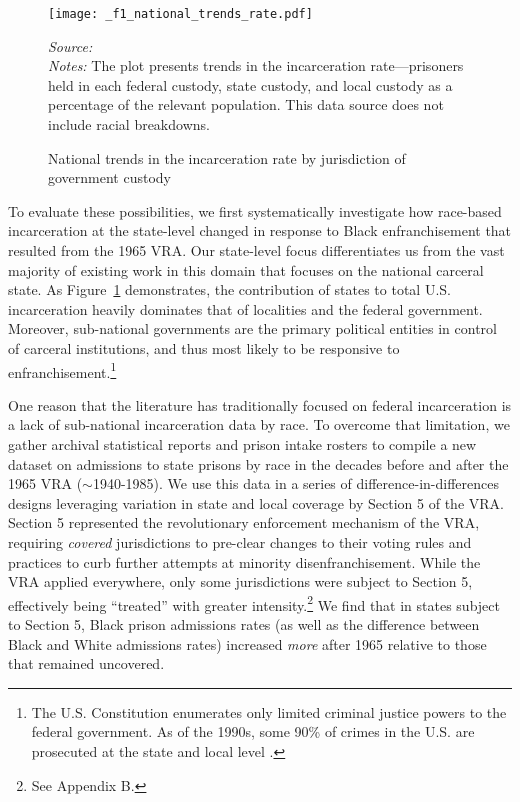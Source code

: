 \documentclass[12pt]{article}
\begin{document}
\begin{figure}[t!]
	\begin{center}
	\caption{National trends in the incarceration rate by jurisdiction of government custody}
		\small \vspace*{.05in}
		\smallskip
				\texttt{[image: \_f1\_national\_trends\_rate.pdf]}
		\label{figure_national_trends}
		\end{center}
    \scriptsize{\emph{Source:} \cite{Stateprisonslocal:2016ua} } \\
	\scriptsize{\emph{Notes:} The plot presents trends in the incarceration rate---prisoners held in each federal custody, state custody, and local custody as a percentage of the relevant population. This data source does not include racial breakdowns. }
\end{figure} \normalsize

To evaluate these possibilities, we first systematically investigate how race-based incarceration at the state-level changed in response to Black enfranchisement that resulted from the 1965 VRA.  Our state-level focus differentiates us from the vast majority of existing work in this domain that focuses on the national carceral state.  As Figure~\ref{figure_national_trends} demonstrates, the contribution of states to total U.S. incarceration heavily dominates that of localities and the federal government.  Moreover, sub-national governments are the primary political entities in control of carceral institutions, and thus most likely to be responsive to enfranchisement.\footnote{The U.S. Constitution enumerates only limited criminal justice powers to the federal government.  As of the 1990s, some 90\% of crimes in the U.S. are prosecuted at the state and local level \citep{Sampson:1997wg}.}

One reason that the literature has traditionally focused on federal incarceration is a lack of sub-national incarceration data by race. To overcome that limitation, we gather archival statistical reports and prison intake rosters to compile a new dataset on admissions to state prisons by race in the decades before and after the 1965 VRA ($\sim$1940-1985). We use this data in a series of difference-in-differences designs leveraging variation in state and local coverage by Section 5 of the VRA.  Section 5 represented the revolutionary enforcement mechanism of the VRA, requiring \emph{covered} jurisdictions to pre-clear changes to their voting rules and practices to curb further attempts at minority disenfranchisement.  While the VRA applied everywhere, only some jurisdictions were subject to Section 5, effectively being ``treated'' with greater intensity.\footnote{See Appendix B.}  We find that in states subject to Section 5, Black prison admissions rates (as well as the difference between Black and White admissions rates) increased \emph{more} after 1965 relative to those that remained uncovered.
\end{document}
